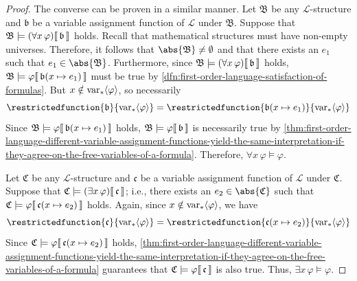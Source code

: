 \begin{proof}
    \vspace{0.3cm}
    \noindent
    The converse can be proven in a similar manner.
    Let \( \mathfrak{B} \) be any \( \mathcal{L} \)-structure and \( \mathfrak{b} \) be a variable assignment function of \( \mathcal{L} \) under \( \mathfrak{B} \).
    Suppose that \( \folwffsatisfaction{\mathfrak{B}}{\mleft( \forall x \, \varphi \mright)}{\mathfrak{b}} \) holds.
    Recall that mathematical structures must have non-empty universes. Therefore, it follows that \( \abs{\mathfrak{B}} \neq \emptyset \) and that
    there exists an \( e_{1} \) such that \( e_{1} \in \abs{\mathfrak{B}} \).
    Furthermore, since \( \folwffsatisfaction{\mathfrak{B}}{\mleft( \forall x \, \varphi \mright)}{\mathfrak{b}} \) holds,
    \( \folwffsatisfaction{\mathfrak{B}}{\varphi}{ \folmodifiedvariableassignmentfunction{\mathfrak{b}}{x}{e_{1}} } \) must be true
    by \cref{dfn:first-order-language-satisfaction-of-formulas}.
    But \( x \notin \operatorname{var}_{\ast} \langle\varphi\rangle \), so necessarily
    \begin{equation*}
        \restrictedfunction{ \mathfrak{b} }{ \folfreevars{\varphi} } =
        \restrictedfunction{ \folmodifiedvariableassignmentfunction{\mathfrak{b}}{x}{e_{1}} }{ \folfreevars{\varphi} }
    \end{equation*}
    Since \( \folwffsatisfaction{\mathfrak{B}}{\varphi}{ \folmodifiedvariableassignmentfunction{\mathfrak{b}}{x}{e_{1}} } \) holds,
    \(  \mathfrak{B} \models \varphi\llbracket\, \mathfrak{b} \,\rrbracket \) is necessarily true by
    \cref{thm:first-order-language-different-variable-assignment-functions-yield-the-same-interpretation-if-they-agree-on-the-free-variables-of-a-formula}.
    Therefore, \( \forall x \, \varphi \models \varphi \).

    \vspace{0.3cm}
    \noindent
    Let \( \mathfrak{C} \) be any \( \mathcal{L} \)-structure and \( \mathfrak{c} \) be a variable assignment function of \( \mathcal{L} \) under \( \mathfrak{C} \).
    Suppose that \( \folwffsatisfaction{\mathfrak{C}}{\mleft( \exists x \, \varphi \mright)}{\mathfrak{c}} \); i.e., there exists an \( e_{2} \in \abs{\mathfrak{C}} \)
    such that \( \folwffsatisfaction{\mathfrak{C}}{\varphi}{ \folmodifiedvariableassignmentfunction{\mathfrak{c}}{x}{e_{2}} } \) holds.
    Again, since \( x \notin \operatorname{var}_{\ast} \langle\varphi\rangle \), we have
    \begin{equation*}
        \restrictedfunction{ \mathfrak{c} }{ \folfreevars{\varphi} } =
        \restrictedfunction{ \folmodifiedvariableassignmentfunction{\mathfrak{c}}{x}{e_{2}} }{ \folfreevars{\varphi} }
    \end{equation*}
    Since \( \folwffsatisfaction{\mathfrak{C}}{\varphi}{ \folmodifiedvariableassignmentfunction{\mathfrak{c}}{x}{e_{2}} } \) holds,
    \cref{thm:first-order-language-different-variable-assignment-functions-yield-the-same-interpretation-if-they-agree-on-the-free-variables-of-a-formula}
    guarantees that \(  \mathfrak{C} \models \varphi\llbracket\, \mathfrak{c} \,\rrbracket \) is also true.
    Thus, \( \exists x \, \varphi \models \varphi \).
\end{proof}

